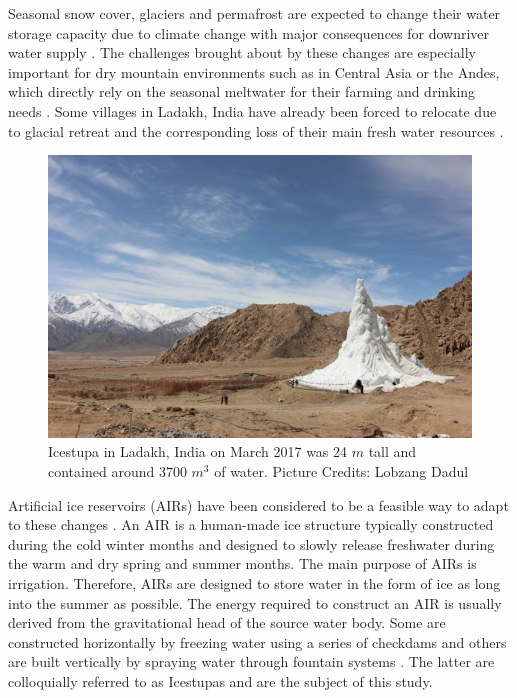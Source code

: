\documentclass[utf8]{frontiersSCNS} %
\begin{document}
Seasonal snow cover, glaciers and permafrost are expected to change their water storage capacity due to climate change
with major consequences for downriver water supply \citep{Immerzeel_2020}. The challenges brought about by these
changes are especially important for dry mountain environments such as in Central Asia or the Andes, which directly
rely on the seasonal meltwater for their farming and drinking needs \citep{HoelzleBarandun_2019, Apel_2018,
Buytaert_2017, Chen_2016, UNGERSHAYESTEH_2013}. Some villages in Ladakh, India have already been forced to relocate
due to glacial retreat and the corresponding loss of their main fresh water resources \citep{zanskar}. 

\begin{figure} \begin{center} \includegraphics[width=10 cm]{Figures/Figure_1.jpg}
\end{center} \caption{Icestupa in Ladakh, India on March 2017 was 24 $m$ tall and contained around 3700 $m^3$ 
of water. Picture Credits: Lobzang Dadul} \label{fig:cone} \end{figure}

Artificial ice reservoirs (AIRs) have been considered to be a feasible way to adapt to these changes \citep{IPCC_2019,
10.1659/MRD-JOURNAL-D-18-00072.1}. An AIR is a human-made ice structure typically constructed during the cold winter
months and designed to slowly release freshwater during the warm and dry spring and summer months. The main purpose of
AIRs is irrigation. Therefore, AIRs are designed to store water in the form of ice as long into the summer as possible.
The energy required to construct an AIR is usually derived from the gravitational head of the source water body. Some
are constructed horizontally by freezing water using a series of checkdams and others are built vertically by spraying
water through fountain systems \citep{Nusser_2018}. The latter are colloquially referred to as Icestupas and are the
subject of this study.
\end{document}
